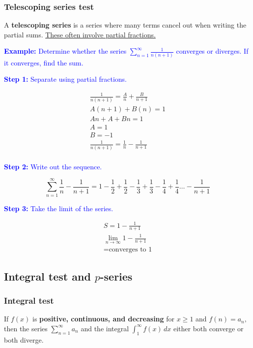 \documentclass[letterpaper, 12pt]{article}
\newcommand{\example}[1]{\textcolor{blue}{\textbf{Example:} #1}}
\newcommand{\step}[2]{\textcolor{blue}{\textbf{Step #1:} #2}}
\begin{document}
\subsubsection*{Telescoping series test}

A \textbf{telescoping series} is a series where many terms cancel out when writing the partial sums. \underline{These often involve partial fractions.}

\example{Determine whether the series $\displaystyle \sum_{n=1}^\infty \frac{1}{n(n+1)}$ converges or diverges. If it converges, find the sum.}

\step{1}{Separate using partial fractions.}

\begin{gather*}
\frac{1}{n(n+1)} = \frac{A}{n} + \frac{B}{n+1} \\
A(n+1) + B(n) = 1 \\
An + A + Bn = 1 \\
A = 1 \\
B = -1 \\
\frac{1}{n(n+1)} = \frac{1}{n} - \frac{1}{n+1} \\
\end{gather*}

\step{2}{Write out the sequence.}

$$\sum_{n = 1}^\infty \frac{1}{n} - \frac{1}{n+1} = 1-\frac12+\frac12-\frac13+\frac13-\frac14+\frac14 \dots - \frac{1}{n+1}$$

\step{3}{Take the limit of the series.}

\begin{gather*}
S = 1 - \frac{1}{n+1} \\
\lim_{n \to \infty} 1 - \frac{1}{n+1}\\
= \boxed{\text{converges to 1}}
\end{gather*}

\subsection*{Integral test and $p$-series}

\subsubsection*{Integral test}

If $f(x)$ is \textbf{positive, continuous, and decreasing} for $x \geq 1$ and $f(n) = a_n,$ then the series $\displaystyle \sum_{n=1}^\infty a_n$ and the integral $\displaystyle \int_1^\infty f(x) \, dx$ either both converge or both diverge.
\end{document}
